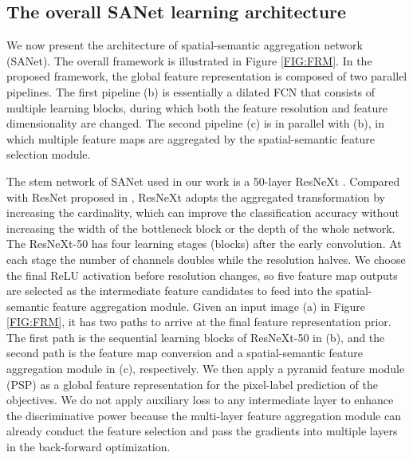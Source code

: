 \documentclass[10pt,twocolumn,twoside]{IEEEtran}
\begin{document}
\subsection{The overall SANet learning architecture}

We now present the architecture of spatial-semantic aggregation network (SANet). The overall framework is illustrated in Figure \ref{FIG:FRM}. In the proposed framework, the global feature representation is composed of two parallel pipelines. The first pipeline (b) is essentially a dilated FCN that consists of multiple learning blocks, during which both the feature resolution and feature dimensionality are changed. The second pipeline (c) is in parallel with (b), in which multiple feature maps are aggregated by the spatial-semantic feature selection module. 

The stem network of SANet used in our work is a 50-layer ResNeXt \cite{CVPR17:RESNEXT}. Compared with ResNet proposed in \cite{CVPR16:RESNET}, ResNeXt adopts the aggregated transformation by increasing the cardinality, which can improve the classification accuracy without increasing the width of the bottleneck block or the depth of the whole network. The ResNeXt-50 has four learning stages (blocks) after the early convolution. At each stage the number of channels doubles while the resolution halves. We choose the final ReLU activation before resolution changes, so five feature map outputs are selected as the intermediate feature candidates to feed into the spatial-semantic feature aggregation module. Given an input image (a) in Figure \ref{FIG:FRM}, it has two paths to arrive at the final feature representation prior. The first path is the sequential learning blocks of ResNeXt-50 in (b), and the second path is the feature map conversion and a spatial-semantic feature aggregation module in (c), respectively. We then apply a pyramid feature module (PSP) \cite{CVPR17:PSPNET} as a global feature representation for the pixel-label prediction of the objectives. We do not apply auxiliary loss to any intermediate layer to enhance the discriminative power because the multi-layer feature aggregation module can already conduct the feature selection and pass the gradients into multiple layers in the back-forward optimization.
\end{document}
